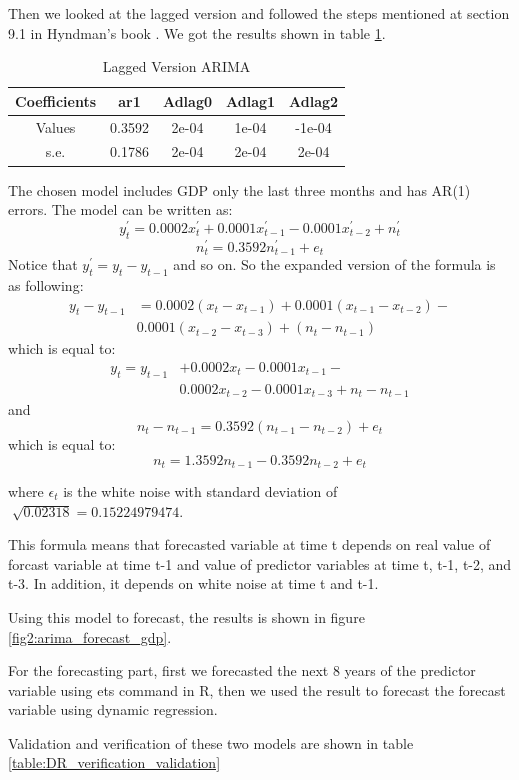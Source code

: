 \documentclass[journal, a4paper]{IEEEtran}
\begin{document}
Then we looked at the lagged version and followed the steps mentioned at section 9.1 in Hyndman's book  \cite{fpp}. We got the results shown in table \ref{table:arima_lag}.
\begin{table}[H]
\caption{Lagged Version ARIMA}
\label{table:arima_lag}
\centering
\begin{tabular}{|c|c|c|c|c|}
\hline
Coefficients & ar1 & Adlag0 & Adlag1 & Adlag2 \\ \hline
Values & 0.3592 & 2e-04 & 1e-04 & -1e-04 \\ \hline
s.e. & 0.1786 & 2e-04 & 2e-04 & 2e-04 \\
\hline
\end{tabular}
\end{table}
The chosen model includes GDP only the last three months and has AR(1) errors. The model can be written as:
$$y_{t}^{'}=0.0002x_{t}^{'}+0.0001x_{t-1}^{'}-0.0001x_{t-2}^{'}+n_{t}^{'}$$
$$n_{t}^{'}=0.3592n_{t-1}^{'}+e_{t}$$
Notice that $y_{t}^{'}=y_{t}-y_{t-1}$ and so on.
So the expanded version of the formula is as following:
\begin{align*}
y_{t}-y_{t-1}&=0.0002(x_{t}-x_{t-1})+ 0.0001(x_{t-1}-x_{t-2})- \\ & 0.0001(x_{t-2}-x_{t-3})+(n_{t}-n_{t-1})
\end{align*}
which is equal to:
\begin{align*}
y_{t}=y_{t-1}&+0.0002x_{t}-0.0001x_{t-1}-\\ & 0.0002x_{t-2}-0.0001x_{t-3}+n_{t}-n_{t-1}
\end{align*}
and 
$$n_{t}-n_{t-1}=0.3592(n_{t-1}-n_{t-2})+e_{t}$$
which is equal to:
$$n_{t}=1.3592n_{t-1}-0.3592n_{t-2}+e_{t}$$

where $\epsilon_{t}$ is the white noise with standard deviation of $\sqrt[]{0.02318}=0.15224979474$.


This formula means that forecasted variable at time t depends on real value of forcast variable at time t-1 and value of predictor variables at time t, t-1, t-2, and t-3. In addition, it depends on white noise at time t and t-1.

Using this model to forecast, the results is shown in figure \ref{fig2:arima_forecast_gdp}.



For the forecasting part, first we forecasted the next 8 years of the predictor variable using ets command in R, then we used the result to forecast the forecast variable using dynamic regression. 

Validation and verification of these two models are shown in table \ref{table:DR_verification_validation}
\end{document}
